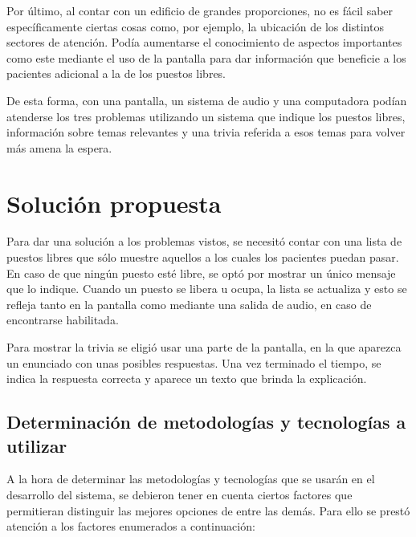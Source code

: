 \documentclass[twoside]{article}
\begin{document}
Por último, al contar con un edificio de grandes proporciones, no es fácil saber específicamente ciertas cosas como, por ejemplo, la ubicación de los distintos sectores de atención. Podía aumentarse el conocimiento de aspectos importantes como este mediante el uso de la pantalla para dar información que beneficie a los pacientes adicional a la de los puestos libres.

De esta forma, con una pantalla, un sistema de audio y una computadora podían atenderse los tres problemas utilizando un sistema que indique los puestos libres, información sobre temas relevantes y una trivia referida a esos temas para volver más amena la espera.
\newpage
\section{Solución propuesta}
Para dar una solución a los problemas vistos, se necesitó contar con una lista de puestos libres que sólo muestre aquellos a los cuales los pacientes puedan pasar. En caso de que ningún puesto esté libre, se optó por mostrar un único mensaje que lo indique. Cuando un puesto se libera u ocupa, la lista se actualiza y esto se refleja tanto en la pantalla como mediante una salida de audio, en caso de encontrarse habilitada.

Para mostrar la trivia se eligió usar una parte de la pantalla, en la que aparezca un enunciado con unas posibles respuestas. Una vez terminado el tiempo, se indica la respuesta correcta y aparece un texto que brinda la explicación.
\newpage
\subsection{Determinación de metodologías y tecnologías a utilizar}
A la hora de determinar las metodologías y tecnologías que se usarán en el desarrollo del sistema, se debieron tener en cuenta ciertos factores que permitieran distinguir las mejores opciones de entre las demás. Para ello se prestó atención a los factores enumerados a continuación:
\end{document}
